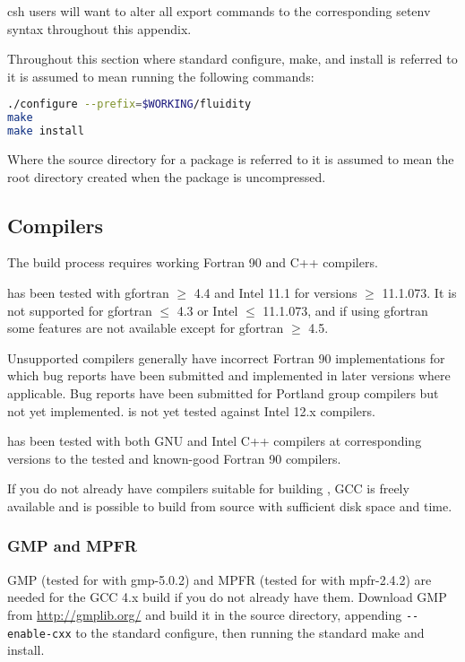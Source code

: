 csh users will want to alter all export commands to the corresponding setenv
syntax throughout this appendix.

Throughout this section where standard configure, make, and install is referred
to it is assumed to mean running the following commands:

\begin{lstlisting}[language=bash]
./configure --prefix=$WORKING/fluidity
make
make install
\end{lstlisting}

Where the source directory for a package is referred to it is assumed to mean
the root directory created when the package is uncompressed.

\subsection{Compilers}
\label{sec:required_libraries_compilers}

The \fluidity build process requires working Fortran 90 and C++ compilers.

\fluidity has been tested with gfortran $\geq$ 4.4 and Intel 11.1 for versions
$\geq$ 11.1.073. It is not supported for gfortran $\leq$ 4.3 or Intel $\leq$
11.1.073, and if using gfortran some features are not available except for
gfortran $\geq$ 4.5.

Unsupported compilers generally have incorrect Fortran 90 implementations for
which bug reports have been submitted and implemented in later versions where
applicable. Bug reports have been submitted for Portland group compilers but
not yet implemented. \fluidity is not yet tested against Intel 12.x compilers.

\fluidity has been tested with both GNU and Intel C++ compilers at corresponding
versions to the tested and known-good Fortran 90 compilers.

If you do not already have compilers suitable for building \fluidity, GCC is
freely available and is possible to build from source with sufficient disk
space and time.

\subsubsection{GMP and MPFR}
\label{sec:required_libraries_compilers_gmp_mpfr}

GMP (tested for \fluidity with gmp-5.0.2) and MPFR (tested for \fluidity with
mpfr-2.4.2) are needed for the GCC 4.x build if you do not already have them.
Download GMP from \url{http://gmplib.org/} and build it in the source
directory, appending \lstinline[language=bash]+--enable-cxx+ to the standard
configure, then running the standard make and install.

